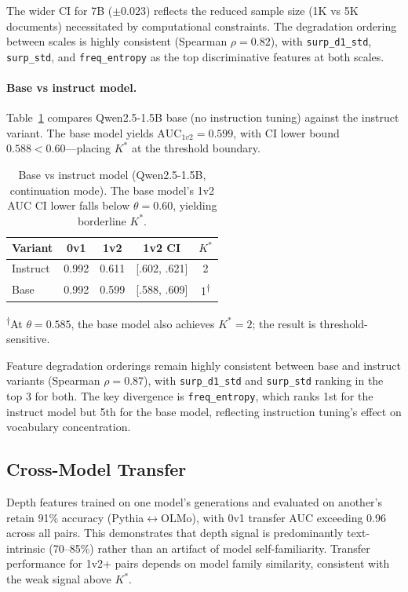 \documentclass[11pt,a4paper]{article}
\newcommand{\Kstar}{K^{*}}
\newcommand{\AUC}{\mathrm{AUC}}
\begin{document}
The wider CI for 7B ($\pm 0.023$) reflects the reduced sample size (1K vs 5K documents) necessitated by computational constraints.
The degradation ordering between scales is highly consistent (Spearman $\rho = 0.82$), with \texttt{surp\_d1\_std}, \texttt{surp\_std}, and \texttt{freq\_entropy} as the top discriminative features at both scales.

\paragraph{Base vs instruct model.}
Table~\ref{tab:base-instruct} compares Qwen2.5-1.5B base (no instruction tuning) against the instruct variant.
The base model yields $\AUC_{1v2} = 0.599$, with CI lower bound $0.588 < 0.60$---placing $\Kstar$ at the threshold boundary.

\begin{table}[t]
\centering
\small
\caption{Base vs instruct model (Qwen2.5-1.5B, continuation mode). The base model's 1v2 AUC CI lower falls below $\theta=0.60$, yielding borderline $\Kstar$.}
\label{tab:base-instruct}
\begin{tabular}{lcccc}
\toprule
\textbf{Variant} & \textbf{0v1} & \textbf{1v2} & \textbf{1v2 CI} & $\Kstar$ \\
\midrule
Instruct & 0.992 & 0.611 & [.602, .621] & 2 \\
Base & 0.992 & 0.599 & [.588, .609] & 1\textsuperscript{$\dagger$} \\
\bottomrule
\end{tabular}
\vspace{0.3em}
\raggedright\scriptsize\textsuperscript{$\dagger$}At $\theta=0.585$, the base model also achieves $\Kstar=2$; the result is threshold-sensitive.
\end{table}

Feature degradation orderings remain highly consistent between base and instruct variants (Spearman $\rho = 0.87$), with \texttt{surp\_d1\_std} and \texttt{surp\_std} ranking in the top 3 for both.
The key divergence is \texttt{freq\_entropy}, which ranks 1st for the instruct model but 5th for the base model, reflecting instruction tuning's effect on vocabulary concentration.

\subsection{Cross-Model Transfer}
\label{sec:transfer}

Depth features trained on one model's generations and evaluated on another's retain 91\% accuracy (Pythia$\leftrightarrow$OLMo), with 0v1 transfer AUC exceeding 0.96 across all pairs.
This demonstrates that depth signal is predominantly text-intrinsic (70--85\%) rather than an artifact of model self-familiarity.
Transfer performance for 1v2+ pairs depends on model family similarity, consistent with the weak signal above $\Kstar$.
\end{document}
